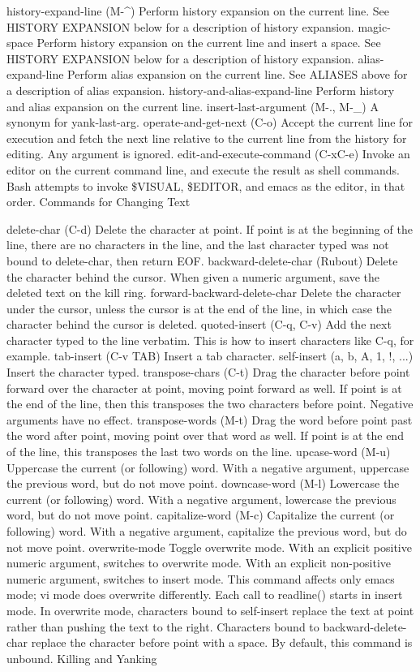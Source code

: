 history-expand-line (M-\^{})
Perform history expansion on the current line. See HISTORY EXPANSION below for a description of history expansion.
magic-space
Perform history expansion on the current line and insert a space. See HISTORY EXPANSION below for a description of history expansion.
alias-expand-line
Perform alias expansion on the current line. See ALIASES above for a description of alias expansion.
history-and-alias-expand-line
Perform history and alias expansion on the current line.
insert-last-argument (M-., M-\_)
A synonym for yank-last-arg.
operate-and-get-next (C-o)
Accept the current line for execution and fetch the next line relative to the current line from the history for editing. Any argument is ignored.
edit-and-execute-command (C-xC-e)
Invoke an editor on the current command line, and execute the result as shell commands. Bash attempts to invoke \$VISUAL, \$EDITOR, and emacs as the editor, in that order.
Commands for Changing Text

delete-char (C-d)
Delete the character at point. If point is at the beginning of the line, there are no characters in the line, and the last character typed was not bound to delete-char, then return EOF.
backward-delete-char (Rubout)
Delete the character behind the cursor. When given a numeric argument, save the deleted text on the kill ring.
forward-backward-delete-char
Delete the character under the cursor, unless the cursor is at the end of the line, in which case the character behind the cursor is deleted.
quoted-insert (C-q, C-v)
Add the next character typed to the line verbatim. This is how to insert characters like C-q, for example.
tab-insert (C-v TAB)
Insert a tab character.
self-insert (a, b, A, 1, !, ...)
Insert the character typed.
transpose-chars (C-t)
Drag the character before point forward over the character at point, moving point forward as well. If point is at the end of the line, then this transposes the two characters before point. Negative arguments have no effect.
transpose-words (M-t)
Drag the word before point past the word after point, moving point over that word as well. If point is at the end of the line, this transposes the last two words on the line.
upcase-word (M-u)
Uppercase the current (or following) word. With a negative argument, uppercase the previous word, but do not move point.
downcase-word (M-l)
Lowercase the current (or following) word. With a negative argument, lowercase the previous word, but do not move point.
capitalize-word (M-c)
Capitalize the current (or following) word. With a negative argument, capitalize the previous word, but do not move point.
overwrite-mode
Toggle overwrite mode. With an explicit positive numeric argument, switches to overwrite mode. With an explicit non-positive numeric argument, switches to insert mode. This command affects only emacs mode; vi mode does overwrite differently. Each call to readline() starts in insert mode. In overwrite mode, characters bound to self-insert replace the text at point rather than pushing the text to the right. Characters bound to backward-delete-char replace the character before point with a space. By default, this command is unbound.
Killing and Yanking

